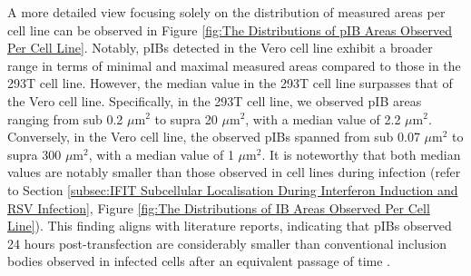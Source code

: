 A more detailed view focusing solely on the distribution of measured areas per cell line can be observed in Figure \ref{fig:The Distributions of pIB Areas Observed Per Cell Line}. Notably, pIBs detected in the Vero cell line exhibit a broader range in terms of minimal and maximal measured areas compared to those in the 293T cell line. However, the median value in the 293T cell line surpasses that of the Vero cell line. Specifically, in the 293T cell line, we observed pIB areas ranging from sub 0.2 \(\mu \mbox{m}^2\) to supra 20 \(\mu \mbox{m}^2\), with a median value of 2.2 \(\mu \mbox{m}^2\). Conversely, in the Vero cell line, the observed pIBs spanned from sub 0.07 \(\mu \mbox{m}^2\) to supra 300 \(\mu \mbox{m}^2\), with a median value of 1 \(\mu \mbox{m}^2\). It is noteworthy that both median values are notably smaller than those observed in cell lines during infection (refer to Section \ref{subsec:IFIT Subcellular Localisation During Interferon Induction and RSV Infection}, Figure \ref{fig:The Distributions of IB Areas Observed Per Cell Line}). This finding aligns with literature reports, indicating that pIBs observed 24 hours post-transfection are considerably smaller than conventional inclusion bodies observed in infected cells after an equivalent passage of time \cite{Jobe2021BovineResponses}.

